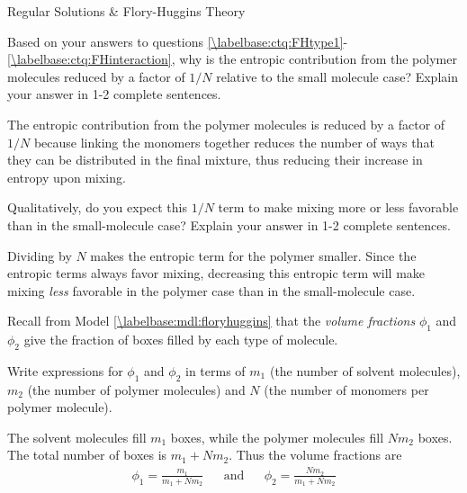 \begin{activity}{Regular Solutions \& Flory-Huggins Theory}
\begin{infobox}
\end{infobox}

\begin{ctqs}

		\question Based on your answers to questions \ref{\labelbase:ctq:FHtype1}-\ref{\labelbase:ctq:FHinteraction}, why is the entropic contribution from the polymer molecules reduced by a factor of $1/N$ relative to the small molecule case? Explain your answer in 1-2 complete sentences.
		
			\begin{solution}[1.75in]{}
			
				The entropic contribution from the polymer molecules is reduced by a factor of $1/N$ because linking the monomers together reduces the number of ways that they can be distributed in the final mixture, thus reducing their increase in entropy upon mixing.
			
			\end{solution}
		
		\question Qualitatively, do you expect this $1/N$ term to make mixing more or less favorable than in the small-molecule case?  Explain your answer in 1-2 complete sentences.
		
			\begin{solution}[2in]{}
			
				Dividing by $N$ makes the entropic term for the polymer smaller.  Since the entropic terms always favor mixing, decreasing this entropic term will make mixing \emph{less} favorable in the polymer case than in the small-molecule case.
			
			\end{solution}
			
\end{ctqs}

\begin{exercises}
			
		\exercise Recall from Model \ref{\labelbase:mdl:floryhuggins} that the \emph{volume fractions} $\phi_1$ and $\phi_2$ give the fraction of boxes filled by each type of molecule.
		
		Write expressions for $\phi_1$ and $\phi_2$ in terms of $m_1$ (the number of solvent molecules), $m_2$ (the number of polymer molecules) and $N$ (the number of monomers per polymer molecule).
				
					\begin{solution}{}
						The solvent molecules fill $m_1$ boxes, while the polymer molecules fill $Nm_2$ boxes.  The total number of boxes is $m_1 + Nm_2$.  Thus the volume fractions are
						\begin{align*}
							\phi_1 = \frac{m_1}{m_1 + Nm_2} && \text{and} && \phi_2 = \frac{Nm_2}{m_1 + Nm_2}
						\end{align*}
					\end{solution}
			

\end{exercises}
\end{activity}
